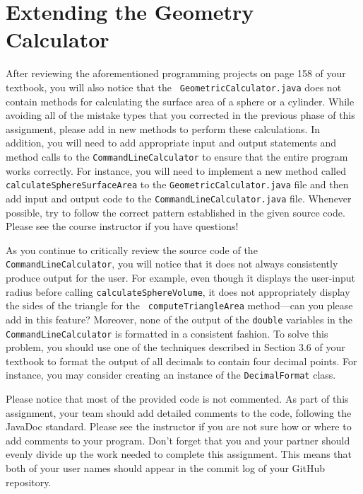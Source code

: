 \documentclass[11pt]{article}
\begin{document}
\section*{Extending the Geometry Calculator}

\begin{sloppypar}
  After reviewing the aforementioned programming projects on page 158 of your textbook, you will also notice that the {\tt
  GeometricCalculator.java} does not contain methods for calculating the surface area of a sphere or a cylinder. While
  avoiding all of the mistake types that you corrected in the previous phase of this assignment, please add in new methods
  to perform these calculations. In addition, you will need to add appropriate input and output statements and method
  calls to the {\tt CommandLineCalculator} to ensure that the entire program works correctly. For instance, you will need to
  implement a new method called {\tt calculateSphereSurfaceArea} to the {\tt GeometricCalculator.java} file and then add
  input and output code to the {\tt CommandLineCalculator.java} file. Whenever possible, try to follow the correct
  pattern established in the given source code. Please see the course instructor if you have questions!
\end{sloppypar}

As you continue to critically review the source code of the {\tt CommandLineCalculator}, you will notice that it does not
always consistently produce output for the user. For example, even though it displays the user-input radius before
calling {\tt calculateSphereVolume}, it does not appropriately display the sides of the triangle for the {\tt
computeTriangleArea} method---can you please add in this feature? Moreover, none of the output of the {\tt double}
variables in the {\tt CommandLineCalculator} is formatted in a consistent fashion. To solve this problem, you should use
one of the techniques described in Section 3.6 of your textbook to format the output of all decimals to contain four
decimal points. For instance, you may consider creating an instance of the {\tt DecimalFormat} class.

Please notice that most of the provided code is not commented. As part of this assignment, your team should add
detailed comments to the code, following the JavaDoc standard. Please see the instructor if you are not sure how or
where to add comments to your program. Don't forget that you and your partner should evenly divide up the work needed to
complete this assignment. This means that both of your user names should appear in the commit log of your GitHub
repository.
\end{document}
